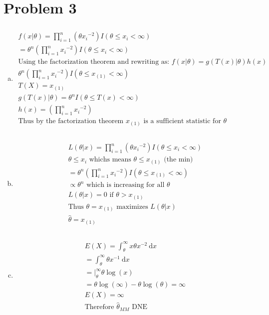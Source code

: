 \documentclass{article}
\newcommand{\dx}{\mathrm{d}x}
\begin{document}
\begin{flushleft}
\begin{enumerate}[(a)]
\end{enumerate}

	\section*{Problem 3}
	
\begin{enumerate}[(a)]
	
	\item 
\begin{multline*}\\
f(x|\theta)=\prod_{i=1}^{n}(\theta {x_i}^{-2})I(\theta \leq x_i<\infty)\\
=\theta^n\left(\prod_{i=1}^{n} {x_i}^{-2}\right)I(\theta \leq x_i<\infty)\\
\text{Using the factorization theorem and rewriting as: } f(x|\theta)=g(T(x)|\theta)h(x)\\
\theta^n\left(\prod_{i=1}^{n} {x_i}^{-2}\right)I(\theta\leq x_{(1)}<\infty)\\
T(X)=x_{(1)}\\
g(T(x)|\theta)=\theta^nI(\theta\leq T(x)<\infty)\\
h(x)=\left(\prod_{i=1}^{n} {x_i}^{-2}\right)\\
\text{Thus by the factorization theorem } x_{(1)} \text{ is a sufficient statistic for } \theta\\
\end{multline*}
	
	\item 
\begin{multline*}\\
L(\theta|x)=\prod_{i=1}^{n}(\theta {x_i}^{-2})I(\theta \leq x_i<\infty)\\
\theta \leq x_i \text{ whichs means } \theta\leq x_{(1)} \text{ (the min)}\\
=\theta^n\left(\prod_{i=1}^{n} {x_i}^{-2}\right)I(\theta \leq x_{(1)}<\infty)\\
\propto \theta^n \text{ which is increasing for all } \theta\\
L(\theta|x)=0 \text{ if } \theta>x_{(1)}\\
\text{Thus } \theta=x_{(1)} \text{ maximizes } L(\theta|x)\\
\hat{\theta}=x_{(1)}\\
\end{multline*}
\pagebreak	
	\item 
\begin{multline*}\\
E(X)=\int_{\theta}^{\infty}x\theta x^{-2} \ \dx\\
=\int_{\theta}^{\infty}\theta x^{-1} \ \dx\\
=\bigg|_{\theta}^{\infty}\theta\log(x)\\
=\theta\log(\infty)-\theta \log(\theta)=\infty\\
E(X)=\infty\\
\text{Therefore } \hat{\theta}_{MM} \text{ DNE}\\
\end{multline*}
	

\end{enumerate}
\end{flushleft}
\end{document}

